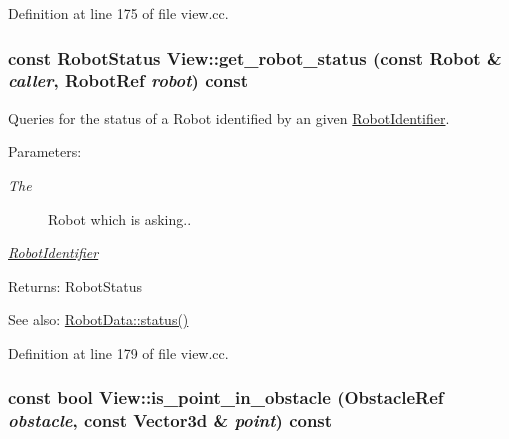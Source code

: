 Definition at line 175 of file view.cc.\hypertarget{class_view_9afafa253b161a72d9d1fa727b652fef}{
\subsubsection[get\_\-robot\_\-status]{\setlength{\rightskip}{0pt plus 5cm}const RobotStatus View::get\_\-robot\_\-status (const Robot \& {\em caller}, \/  RobotRef {\em robot}) const}}
\label{class_view_9afafa253b161a72d9d1fa727b652fef}


Queries for the status of a Robot identified by an given \hyperlink{class_robot_identifier}{RobotIdentifier}. \begin{Desc}
\item[Parameters:]
\begin{description}
\item[{\em The}]Robot which is asking.. \item[{\em \hyperlink{class_robot_identifier}{RobotIdentifier}}]\end{description}
\end{Desc}
\begin{Desc}
\item[Returns:]RobotStatus \end{Desc}
\begin{Desc}
\item[See also:]\hyperlink{class_robot_data_9c8d2252555f1d5866c0332a80e82685}{RobotData::status()} \end{Desc}


Definition at line 179 of file view.cc.\hypertarget{class_view_4fe93f018f5b3fc812f30e6b0d91c9e6}{
\subsubsection[is\_\-point\_\-in\_\-obstacle]{\setlength{\rightskip}{0pt plus 5cm}const bool View::is\_\-point\_\-in\_\-obstacle (ObstacleRef {\em obstacle}, \/  const Vector3d \& {\em point}) const}}
\label{class_view_4fe93f018f5b3fc812f30e6b0d91c9e6}


